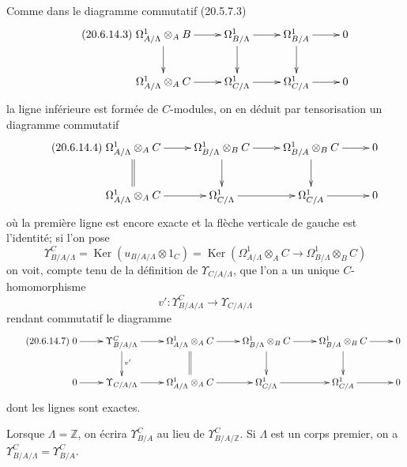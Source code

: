 \begin{env}[20.6.14]
Comme dans le diagramme commutatif (20.5.7.3)
\begin{equation}
\tag{20.6.14.3}
\label{0.20.6.14.3-fr}
\xymatrix{
  \Omega^1_{A/\Lambda}\otimes_A B \ar[r] \ar[d] &
  \Omega^1_{B/\Lambda} \ar[r] \ar[d] &
  \Omega^1_{B/A} \ar[r] \ar[d] & 0 \\
  \Omega^1_{A/\Lambda}\otimes_A C \ar[r] &
  \Omega^1_{C/\Lambda} \ar[r] & \Omega^1_{C/A} \ar[r] & 0
}
\end{equation}
la ligne inférieure est formée de $C$-modules, on en déduit par
tensorisation un diagramme commutatif
\begin{equation}
\tag{20.6.14.4}
\label{0.20.6.14.4-fr}
\xymatrix{
  \Omega^1_{A/\Lambda}\otimes_A C \ar[r] \ar@{=}[d] &
  \Omega^1_{B/\Lambda}\otimes_B C \ar[r] \ar[d] &
  \Omega^1_{B/A}\otimes_B C \ar[r] \ar[d] & 0 \\
  \Omega^1_{A/\Lambda}\otimes_A C \ar[r] &
  \Omega^1_{C/\Lambda} \ar[r] & \Omega^1_{C/A} \ar[r] & 0
}
\end{equation}
où la première ligne est encore exacte et la flèche verticale de gauche
est l'identité; si l'on pose
\begin{equation}
\tag{20.6.14.5}
\label{0.20.6.14.5-fr}
  \Upsilon^C_{B/A/\Lambda}=
  \operatorname{Ker}(u_{B/A/\Lambda}\otimes1_C)=
  \operatorname{Ker}(\Omega^1_{A/\Lambda}\otimes_A C\longrightarrow
       \Omega^1_{B/\Lambda}\otimes_B C)
\end{equation}
on voit, compte tenu de la définition de $\Upsilon_{C/A/\Lambda}$, que
l'on a un unique $C$-homomorphisme
\begin{equation}
\tag{20.6.14.6}
\label{0.20.6.14.6-fr}
  v':\Upsilon^C_{B/A/\Lambda}\longrightarrow\Upsilon_{C/A/\Lambda}
\end{equation}
rendant commutatif le diagramme
\begin{equation}
\tag{20.6.14.7}
\label{0.20.6.14.7-fr}
\xymatrix{
  0 \ar[r] & \Upsilon^C_{B/A/\Lambda} \ar[r] \ar[d]^{v'} &
  \Omega^1_{A/\Lambda}\otimes_A C \ar[r] \ar@{=}[d] &
  \Omega^1_{B/\Lambda}\otimes_B C \ar[r] \ar[d] &
  \Omega^1_{B/A}\otimes_B C \ar[r] \ar[d] & 0 \\
  0 \ar[r] & \Upsilon_{C/A/\Lambda} \ar[r] &
  \Omega^1_{A/\Lambda}\otimes_A C \ar[r] &
  \Omega^1_{C/\Lambda} \ar[r] & \Omega^1_{C/A} \ar[r] & 0
}
\end{equation}
dont les lignes sont exactes.

Lorsque $\Lambda=\mathbb{Z}$, on écrira $\Upsilon^C_{B/A}$ au lieu de
$\Upsilon^C_{B/A/\mathbb{Z}}$. Si $\Lambda$ est un corps premier, on a
$\Upsilon^C_{B/A/\Lambda}=\Upsilon^C_{B/A}$.
\end{env}

